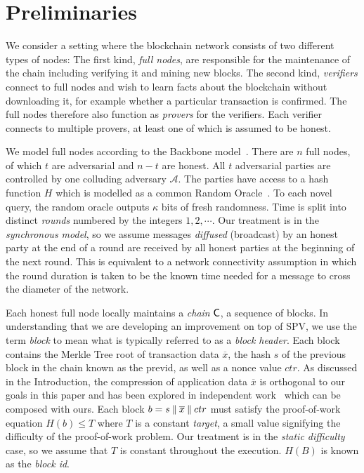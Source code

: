 \section{Preliminaries}

We consider a setting where the blockchain network consists of two different
types of nodes: The first kind, \emph{full nodes}, are responsible for the
maintenance of the chain including verifying it and mining new blocks. The
second kind, \emph{verifiers} connect to full nodes and wish to learn facts
about the blockchain without downloading it, for example whether a particular
transaction is confirmed. The full nodes therefore also function as
\emph{provers} for the verifiers. Each verifier connects to multiple provers, at
least one of which is assumed to be honest.

We model full nodes according to the Backbone model~\cite{backbone}. There are
$n$ full nodes, of which $t$ are adversarial and $n - t$ are honest. All $t$
adversarial parties are controlled by one colluding adversary $\mathcal{A}$. The
parties have access to a hash function $H$ which is modelled as a common Random
Oracle~\cite{ro}. To each novel query, the random oracle outputs $\kappa$ bits
of fresh randomness. Time is split into distinct \emph{rounds} numbered by the
integers $1, 2, \cdots$. Our treatment is in the \emph{synchronous model}, so we
assume messages \emph{diffused} (broadcast) by an honest party at the end of a
round are received by all honest parties at the beginning of the next round.
This is equivalent to a network connectivity assumption in which the round
duration is taken to be the known time needed for a message to cross the
diameter of the network.

Each honest full node locally maintains a \emph{chain} $\mathsf{C}$, a sequence of
blocks. In understanding that we are developing an improvement on top of SPV, we
use the term \emph{block} to mean what is typically referred to as a
\emph{block header}. Each block contains the Merkle Tree root of transaction
data $\overline{x}$, the hash $s$ of the previous block in the chain known as
the previd, as well as a nonce value $ctr$. As discussed in the Introduction,
the compression of application data $\overline{x}$ is orthogonal to our goals in
this paper and has been explored in independent work~\cite{edrax} which can be
composed with ours. Each block $b = s \mathbin{\|} \overline{x} \mathbin{\|} ctr$ must
satisfy the proof-of-work equation $H(b) \leq T$ where $T$ is a constant
\emph{target}, a small value signifying the difficulty of the proof-of-work
problem. Our treatment is in the \emph{static difficulty} case, so we assume
that $T$ is constant throughout the execution. $H(B)$ is known as the
\emph{block id}.

